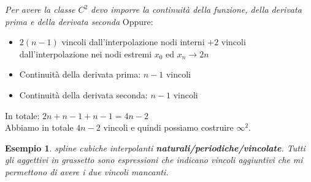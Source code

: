 \documentclass[a4paper, portrait]{book}
\numberwithin{equation}{chapter} %
\newtheorem{example}{Esempio}
\begin{document}
\textit{Per avere la classe $C^2$ devo imporre la continuità della funzione, della derivata prima e della derivata seconda}
Oppure:
\begin{itemize}
    \item $2(n-1)$ vincoli dall'interpolazione nodi interni $+2$ vincoli dall'interpolazione nei nodi estremi $x_0$ ed $x_n \rightarrow 2n$
    \item Continuità della derivata prima: $n-1$ vincoli
    \item Continuità della derivata seconda: $n-1$ vincoli
\end{itemize}
In totale: $2n+n-1+n-1 = 4n -2$\\
Abbiamo in totale $4n-2$ vincoli e quindi possiamo costruire $\infty^2$.\\
\begin{example}
    spline cubiche interpolanti \textbf{naturali/periodiche/vincolate}. Tutti gli aggettivi in grassetto sono espressioni che indicano vincoli aggiuntivi che mi permettono di avere i due vincoli mancanti.
\end{example}
\end{document}

